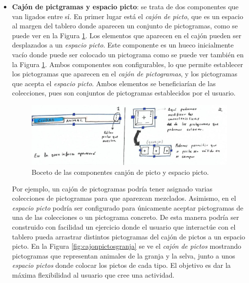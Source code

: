 \begin{itemize}
	
	\item \textbf{Cajón de pictgramas y espacio picto}: se trata de dos componentes que van ligados entre sí. En primer lugar está el \textit{cajón de picto}, que es un espacio al margen del tablero donde aparecen un conjunto de pictogramas, como se puede ver en la Figura \ref{fig:componentecajon}. Los elementos que aparecen en el cajón pueden  ser desplazados a un \textit{espacio picto}. Este componente es un hueco inicialmente vacío donde puede ser colocado un pictograma como se puede ver también en la Figura \ref{fig:componentecajon}. Ambos componentes son configurables, lo que permite establecer los pictogramas que aparecen en el \textit{cajón de pictogramas}, y los pictogramas que acepta el \textit{espacio picto}. Ambos elementos se beneficiarían de las colecciones, pues son conjuntos de pictogramas establecidos por el usuario.
	
	\begin{figure}[h!]
		\centering
		\includegraphics[width=0.7\linewidth]{Imagenes/Bitmap/componenteCajon}
		\caption{Boceto de las componentes canjón de picto y espacio picto.}
		\label{fig:componentecajon}
	\end{figure}
	
	
	Por ejemplo, un cajón de pictogramas podría tener asignado varias colecciones de pictogramas para que aparezcan mezclados. Asimismo, en el \textit{espacio picto} podría ser configurado para únicamente aceptar pictogramas de una de las colecciones o un pictograma concreto. De esta manera podría ser construido con facilidad un ejercicio donde el usuario que interactúe con el tablero pueda arrastrar distintos pictogramas del cajón de pictos a un espacio picto. En la Figura \ref{fig:cajonpictosgranja} se ve el \textit{cajón de pictos} mostrando pictogramas que representan animales de la granja y la selva, junto a unos \textit{espacio pictos} donde colocar los pictos de cada tipo.  El objetivo es dar la máxima flexibilidad al usuario que cree una actividad.
	

\end{itemize}
